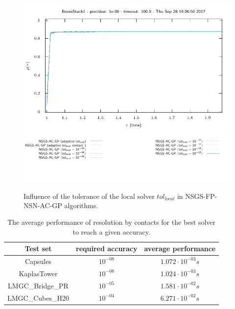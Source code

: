 \begin{figure}
\includegraphics[width=\figwidth]{../figure/NSGS/LocalTol/1.0e-08/100/time/profile-BoxesStack1.pdf} 
\includegraphics[width=\figwidth]{../figure/NSGS/LocalTol/1.0e-08/100/time/profile-BoxesStack1_legend.pdf} 
  \caption{Influence of the tolerance of the local solver $tol_{local}$ in NSGS-FP-NSN-AC-GP algorithms.} 
\end{figure}



\begin{table}[htbp]
  \centering
  \begin{tabular}{|c|c|c|}
    \hline
    Test set & required accuracy &  average performance \\
    \hline
    \hline
    Capsules & $10^{-08}$ & $ 1.072 \cdot 10^{-03} s$ \\
    KaplasTower & $10^{-08}$ &  $1.024 \cdot 10^{-03} s$ \\
    LMGC\_Bridge\_PR & $10^{-05}$&$1.581 \cdot 10^{-02} s $ \\
    LMGC\_Cubes\_H20 &$10^{-04}$ &$6.271 \cdot 10^{-02} s $\\
    \hline
  \end{tabular}
  \caption{The average performance of resolution by contacts for the best solver to reach a given accuracy.}
  \label{tab:hardness}
\end{table}



